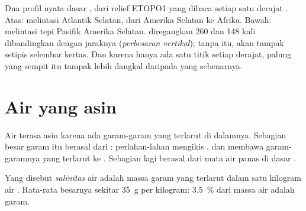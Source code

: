 \begin{omfigure}
{\small Dua profil nyata dasar , dari relief ETOPO1 yang dibaca
setiap satu derajat . Atas: melintasi Atlantik Selatan, dari Amerika
Selatan ke Afrika. Bawah: melintasi tepi Pasifik Amerika Selatan.
 diregangkan 260 dan 148 kali dibandingkan dengan jaraknya
(\emph{perbesaran vertikal}); tanpa itu,  akan tampak setipis
selembar kertas. Dan karena hanya ada satu titik setiap derajat, palung
yang sempit itu tampak lebih dangkal daripada yang sebenarnya.}
\label{fig:g8:the-oceans:profiles}
\end{omfigure}


\section{Air yang asin}

Air  terasa asin karena ada garam-garam yang terlarut di dalamnya.
Sebagian besar garam itu berasal dari  :  perlahan-lahan
mengikis , dan  membawa garam-garamnya yang terlarut ke .
Sebagian lagi berasal dari mata air panas di dasar .

\begin{definition}[Salinitas]\label{def:g8:the-oceans:salinity}
Yang disebut \emph{salinitas} air  adalah massa
garam yang terlarut dalam satu kilogram air . Rata-rata besarnya
sekitar \qty{35}{g} per kilogram: \qty{3.5}{\%} dari massa air 
adalah garam.
\end{definition}

